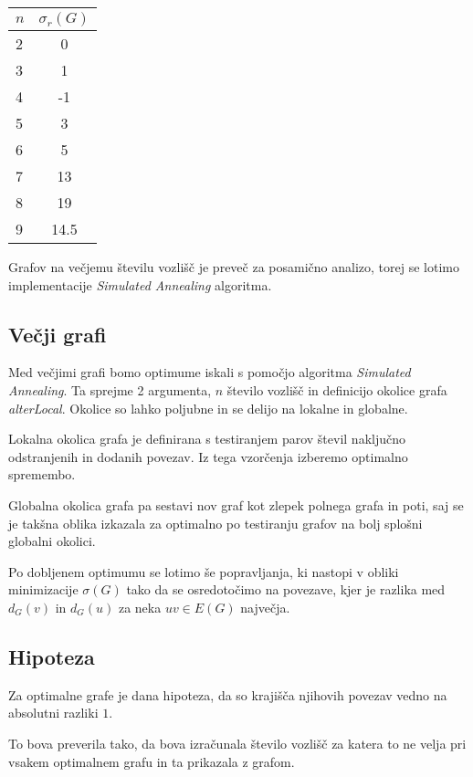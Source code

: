 \documentclass[ letterpaper, titlepage, fleqn]{article}
\begin{document}
\begin{center}
    \begin{tabular}{|  l | c | }
      \hline
      $n$ & $\sigma_r(G)$ \\ \hline
      2 & 0 \\ 
      3 & 1 \\ 
      4 & -1 \\ 
      5 & 3 \\ 
      6 & 5 \\ 
      7 & 13 \\ 
      8 & 19 \\ 
      9 & 14.5 \\ 
      \hline
    \end{tabular}
  \end{center}

Grafov na večjemu številu vozlišč je preveč za posamično analizo, torej
se lotimo implementacije {\em Simulated Annealing} algoritma.

\subsection{Večji grafi}

Med večjimi grafi bomo optimume iskali s pomočjo algoritma
{\em Simulated Annealing}. Ta sprejme 2 argumenta,
{\em $n$} število vozlišč in definicijo
okolice grafa {\em alterLocal}.
Okolice so lahko poljubne in se delijo na lokalne in globalne.

Lokalna okolica grafa je definirana s testiranjem parov števil naključno
odstranjenih in dodanih povezav. Iz tega vzorčenja izberemo optimalno 
spremembo.

Globalna okolica grafa pa sestavi nov graf kot zlepek polnega grafa in poti, 
saj se je takšna oblika izkazala za optimalno po testiranju grafov na
bolj splošni globalni okolici.

Po dobljenem optimumu se lotimo še popravljanja, ki nastopi v obliki
minimizacije $\sigma(G)$ tako da se osredotočimo na povezave, kjer
je razlika med $d_G(v)$ in $d_G(u)$ za neka $uv \in E(G)$ največja.

\subsection{Hipoteza}

Za optimalne grafe je dana hipoteza, da so krajišča njihovih povezav
vedno na absolutni razliki $1$.

To bova preverila tako, da bova izračunala število vozlišč za katera
to ne velja pri vsakem optimalnem grafu in ta prikazala z grafom.
\end{document}
